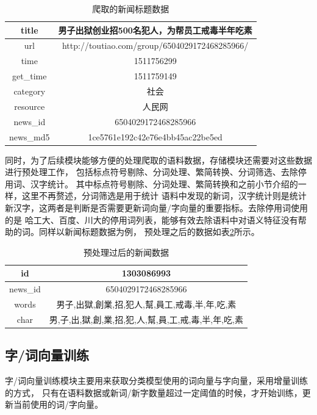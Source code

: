 \begin{table}[h]
    \caption{爬取的新闻标题数据}
    \begin{tabular}{|c|c|}
        \hline
        title & 男子出狱创业招500名犯人，为帮员工戒毒半年吃素 \\
        \hline
        url & http://toutiao.com/group/6504029172468285966/ \\
        \hline
        time & 1511756299 \\
        \hline
        get\_time & 1511759149 \\
        \hline
         category & 社会 \\
        \hline
        resource & 人民网 \\
        \hline
        news\_id & 6504029172468285966 \\
        \hline
        news\_md5 &  1ce5761e192c42e76e4bb45ac22be5ed \\
        \hline
    \end{tabular}
    \label{news_data_table}
    \end{table}

同时，为了后续模块能够方便的处理爬取的语料数据，存储模块还需要对这些数据进行预处理工作，
包括标点符号剔除、分词处理、繁简转换、分词筛选、去除停用词、汉字统计。
其中标点符号剔除、分词处理、繁简转换和之前小节介绍的一样，这里不再赘述，分词筛选是用于统计
语料中发现的新词，汉字统计则是统计新汉字，这两者是判断是否需要更新词向量/字向量的重要指标。去除停用词使用的是
哈工大、百度、川大的停用词列表，能够有效去除语料中对语义特征没有帮助的词。同样以新闻标题数据为例，
预处理之后的数据如表\ref{pretreatment_data_table}所示。
\begin{table}[h]
    \caption{预处理过后的新闻数据}
    \begin{tabular}{|c|c|}
        \hline
        id & 1303086993 \\
        \hline
        news\_id & 6504029172468285966 \\
        \hline
        words & 男子,出獄,創業,招,犯人,幫,員工,戒毒,半,年,吃,素 \\
        \hline
        char & 男,子,出,獄,創,業,招,犯,人,幫,員,工,戒,毒,半,年,吃,素 \\
        \hline
    \end{tabular}
    \label{pretreatment_data_table}
    \end{table}
\subsection{字/词向量训练}
字/词向量训练模块主要用来获取分类模型使用的词向量与字向量，采用增量训练的方式，
只有在语料数据或新词/新字数量超过一定阈值的时候，才开始训练，更新当前使用的词/字向量。

